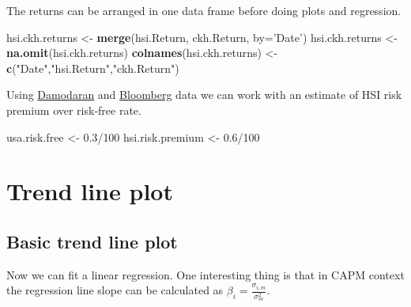 \documentclass[]{article}
\newenvironment{Shaded}{\begin{snugshade}}{\end{snugshade}}
\newcommand{\KeywordTok}[1]{\textcolor[rgb]{0.13,0.29,0.53}{\textbf{{#1}}}}
\newcommand{\DataTypeTok}[1]{\textcolor[rgb]{0.13,0.29,0.53}{{#1}}}
\newcommand{\DecValTok}[1]{\textcolor[rgb]{0.00,0.00,0.81}{{#1}}}
\newcommand{\FloatTok}[1]{\textcolor[rgb]{0.00,0.00,0.81}{{#1}}}
\newcommand{\StringTok}[1]{\textcolor[rgb]{0.31,0.60,0.02}{{#1}}}
\newcommand{\NormalTok}[1]{{#1}}
\begin{document}
The returns can be arranged in one data frame before doing plots and
regression.

\begin{Shaded}
\begin{Highlighting}[]
\NormalTok{hsi.ckh.returns <-}\StringTok{ }\KeywordTok{merge}\NormalTok{(hsi.Return, ckh.Return, }\DataTypeTok{by=}\StringTok{'Date'}\NormalTok{)}
\NormalTok{hsi.ckh.returns <-}\StringTok{ }\KeywordTok{na.omit}\NormalTok{(hsi.ckh.returns)}
\KeywordTok{colnames}\NormalTok{(hsi.ckh.returns) <-}\StringTok{ }\KeywordTok{c}\NormalTok{(}\StringTok{"Date"}\NormalTok{,}\StringTok{"hsi.Return"}\NormalTok{,}\StringTok{"ckh.Return"}\NormalTok{)}
\end{Highlighting}
\end{Shaded}

Using
\href{http://pages.stern.nyu.edu/~adamodar/New_Home_Page/datafile/ctryprem.html}{Damodaran}
and
\href{http://www.bloomberg.com/markets/rates-bonds/government-bonds/us}{Bloomberg}
data we can work with an estimate of HSI risk premium over risk-free
rate.

\begin{Shaded}
\begin{Highlighting}[]
\NormalTok{usa.risk.free <-}\StringTok{ }\FloatTok{0.3}\NormalTok{/}\DecValTok{100}
\NormalTok{hsi.risk.premium <-}\StringTok{ }\FloatTok{0.6}\NormalTok{/}\DecValTok{100}
\end{Highlighting}
\end{Shaded}

\section{Trend line plot}\label{trend-line-plot}

\subsection{Basic trend line plot}\label{basic-trend-line-plot}

Now we can fit a linear regression. One interesting thing is that in
CAPM context the regression line slope can be calculated as
\(\beta_i = \displaystyle \frac{\sigma_{i,m}}{\sigma_m^2}\).
\end{document}

